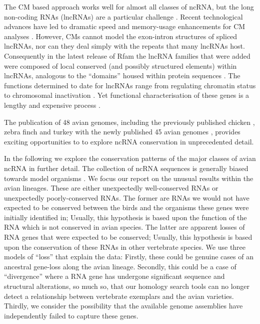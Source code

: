 \documentclass[10pt]{bmc_article}
\newenvironment{bmcformat}{\begin{raggedright}\baselineskip20pt\sloppy\setboolean{publ}{false}}{\end{raggedright}\baselineskip20pt\sloppy}
\begin{document}
\begin{bmcformat}
The CM based approach works well for almost all classes of ncRNA, but
the long non-coding RNAs (lncRNAs) are a particular challenge
\cite{Guttman:2009}. Recent technological advances have led to
dramatic speed and memory-usage enhancements for CM analyses
\cite{Eddy:2002,Nawrocki:2007,Nawrocki:2009,Eddy:2011}. However, CMs
cannot model the exon-intron structures of spliced lncRNAs, nor can
they deal simply with the repeats that many lncRNAs host. Consequently
in the latest release of Rfam the lncRNA families that were added were
composed of local conserved (and possibly structured elements) within
lncRNAs, analogous to the ``domains'' housed within protein sequences
\cite{Burge:2013}. The functions determined to date for lncRNAs range
from regulating chromatin status to chromosomal inactivation
\cite{Rinn:2007,Chow:2005}. Yet functional characterisation of these
genes is a lengthy and expensive process \cite{Guttman:2009}.

The publication of 48 avian genomes, including the previously
published chicken
\cite{International_Chicken_Genome_Sequencing_Consortium:2004}, zebra
finch \cite{Warren:2010} and turkey \cite{Dalloul:2010} with the newly
published 45 avian genomes \cite{birds:14,birds:14a}, provides
exciting opportunities to to explore ncRNA conservation in
unprecedented detail.

In the following we explore the conservation patterns of the major
classes of avian ncRNA in further detail. The collection of ncRNA
sequences is generally biased towards model organisms
\cite{Gardner:2010,Hoeppner:2012}. We focus our report on the unusual
results within the avian lineages. These are either unexpectedly
well-conserved RNAs or unexpectedly poorly-conserved RNAs. The former
are RNAs we would not have expected to be conserved between the birds
and the organisms these genes were initially identified in; Usually,
this hypothesis is based upon the function of the RNA which is not
conserved in avian species. The latter are apparent losses of RNA
genes that were expected to be conserved; Usually, this hypothesis is
based upon the conservation of these RNAs in other vertebrate species.
We use three models of ``loss'' that explain the data: Firstly, these
could be genuine cases of an ancestral gene-loss along the avian
lineage. Secondly, this could be a case of ``divergence'' where a RNA
gene has undergone significant sequence and structural alterations, so
much so, that our homology search tools can no longer detect a
relationship between vertebrate exemplars and the avian
varieties. Thirdly, we consider the possibility that the available
genome assemblies have independently failed to capture these genes.


\end{bmcformat}
\end{document}
